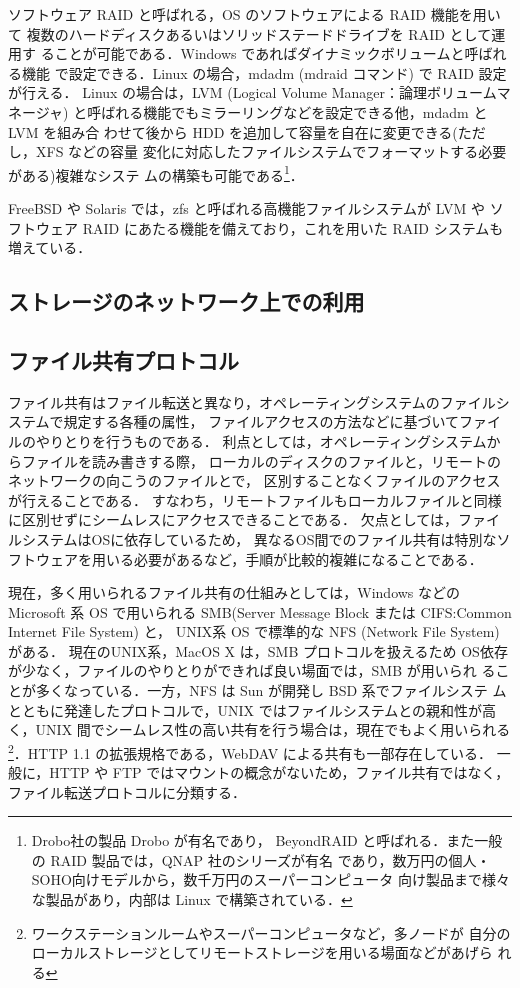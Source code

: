 ソフトウェア RAID と呼ばれる，OS のソフトウェアによる RAID 機能を用いて
複数のハードディスクあるいはソリッドステードドライブを RAID として運用す
ることが可能である．Windows であればダイナミックボリュームと呼ばれる機能
で設定できる．Linux の場合，mdadm (mdraid コマンド) で RAID 設定が行える．
Linux の場合は，LVM (Logical Volume Manager：論理ボリュームマネージャ) 
と呼ばれる機能でもミラーリングなどを設定できる他，mdadm と LVM を組み合
わせて後から HDD を追加して容量を自在に変更できる(ただし，XFS などの容量
変化に対応したファイルシステムでフォーマットする必要がある)複雑なシステ
ムの構築も可能である\footnote{Drobo社の製品 Drobo が有名であり，
BeyondRAID と呼ばれる．また一般の RAID 製品では，QNAP 社のシリーズが有名
であり，数万円の個人・SOHO向けモデルから，数千万円のスーパーコンピュータ
向け製品まで様々な製品があり，内部は Linux で構築されている．}．

FreeBSD や Solaris では，zfs と呼ばれる高機能ファイルシステムが LVM や
ソフトウェア RAID にあたる機能を備えており，これを用いた RAID システムも
増えている．

\subsection{ストレージのネットワーク上での利用}

\subsection*{ファイル共有プロトコル}

ファイル共有はファイル転送と異なり，オペレーティングシステムのファイルシステムで規定する各種の属性，
ファイルアクセスの方法などに基づいてファイルのやりとりを行うものである．
利点としては，オペレーティングシステムからファイルを読み書きする際，
ローカルのディスクのファイルと，リモートのネットワークの向こうのファイルとで，
区別することなくファイルのアクセスが行えることである．
すなわち，リモートファイルもローカルファイルと同様に区別せずにシームレスにアクセスできることである．
欠点としては，ファイルシステムはOSに依存しているため，
異なるOS間でのファイル共有は特別なソフトウェアを用いる必要があるなど，手順が比較的複雑になることである．

現在，多く用いられるファイル共有の仕組みとしては，Windows などの
Microsoft 系 OS で用いられる SMB(Server Message Block または CIFS:Common Internet File System) と，
UNIX系 OS で標準的な NFS (Network File System)がある．
現在のUNIX系，MacOS X は，SMB プロトコルを扱えるため
OS依存が少なく，ファイルのやりとりができれば良い場面では，SMB が用いられ
ることが多くなっている．一方，NFS は Sun が開発し BSD 系でファイルシステ
ムとともに発達したプロトコルで，UNIX ではファイルシステムとの親和性が高
く，UNIX 間でシームレス性の高い共有を行う場合は，現在でもよく用いられる
\footnote{ワークステーションルームやスーパーコンピュータなど，多ノードが
自分のローカルストレージとしてリモートストレージを用いる場面などがあげら
れる}．HTTP 1.1 の拡張規格である，WebDAV による共有も一部存在している．
一般に，HTTP や FTP ではマウントの概念がないため，ファイル共有ではなく，
ファイル転送プロトコルに分類する．


